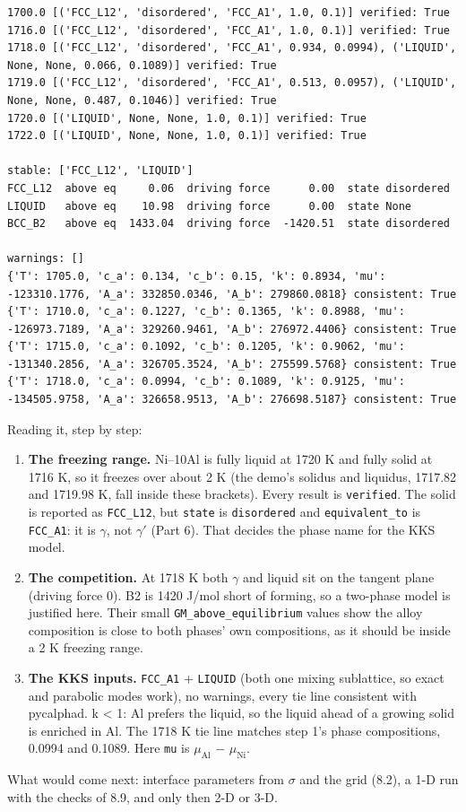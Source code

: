 \documentclass[12pt,a4paper]{article}
\begin{document}
\begin{lstlisting}[basicstyle={\scriptsize\ttfamily}]
1700.0 [('FCC_L12', 'disordered', 'FCC_A1', 1.0, 0.1)] verified: True
1716.0 [('FCC_L12', 'disordered', 'FCC_A1', 1.0, 0.1)] verified: True
1718.0 [('FCC_L12', 'disordered', 'FCC_A1', 0.934, 0.0994), ('LIQUID', None, None, 0.066, 0.1089)] verified: True
1719.0 [('FCC_L12', 'disordered', 'FCC_A1', 0.513, 0.0957), ('LIQUID', None, None, 0.487, 0.1046)] verified: True
1720.0 [('LIQUID', None, None, 1.0, 0.1)] verified: True
1722.0 [('LIQUID', None, None, 1.0, 0.1)] verified: True

stable: ['FCC_L12', 'LIQUID']
FCC_L12  above eq     0.06  driving force      0.00  state disordered
LIQUID   above eq    10.98  driving force      0.00  state None
BCC_B2   above eq  1433.04  driving force  -1420.51  state disordered

warnings: []
{'T': 1705.0, 'c_a': 0.134, 'c_b': 0.15, 'k': 0.8934, 'mu': -123310.1776, 'A_a': 332850.0346, 'A_b': 279860.0818} consistent: True
{'T': 1710.0, 'c_a': 0.1227, 'c_b': 0.1365, 'k': 0.8988, 'mu': -126973.7189, 'A_a': 329260.9461, 'A_b': 276972.4406} consistent: True
{'T': 1715.0, 'c_a': 0.1092, 'c_b': 0.1205, 'k': 0.9062, 'mu': -131340.2856, 'A_a': 326705.3524, 'A_b': 275599.5768} consistent: True
{'T': 1718.0, 'c_a': 0.0994, 'c_b': 0.1089, 'k': 0.9125, 'mu': -134505.9758, 'A_a': 326658.9513, 'A_b': 276698.5187} consistent: True
\end{lstlisting}
Reading it, step by step:

\begin{enumerate}
\item \textbf{The freezing range.} Ni--10Al is fully liquid at 1720 K and fully solid at 1716 K, so it freezes over about 2 K (the demo's solidus and liquidus, 1717.82 and 1719.98 K, fall inside these brackets). Every result is \texttt{verified}. The solid is reported as \texttt{FCC\_\allowbreak{}L12}, but \texttt{state} is \texttt{disordered} and \texttt{equivalent\_\allowbreak{}to} is \texttt{FCC\_\allowbreak{}A1}: it is \(\gamma\), not \(\gamma '\) (Part 6). That decides the phase name for the KKS model.
\item \textbf{The competition.} At 1718 K both \(\gamma\) and liquid sit on the tangent plane (driving force 0). B2 is 1420 J/mol short of forming, so a two-phase model is justified here. Their small \texttt{GM\_\allowbreak{}above\_\allowbreak{}equilibrium} values show the alloy composition is close to both phases' own compositions, as it should be inside a 2 K freezing range.
\item \textbf{The KKS inputs.} \texttt{FCC\_\allowbreak{}A1} + \texttt{LIQUID} (both one mixing sublattice, so exact and parabolic modes work), no warnings, every tie line consistent with pycalphad. k < 1: Al prefers the liquid, so the liquid ahead of a growing solid is enriched in Al. The 1718 K tie line matches step 1's phase compositions, 0.0994 and 0.1089. Here \texttt{mu} is \(\mu_{\mathrm{Al}}\) \(-\) \(\mu_{\mathrm{Ni}}\).
\end{enumerate}
What would come next: interface parameters from \(\sigma\) and the grid (8.2), a 1-D run with the checks of 8.9, and only then 2-D or 3-D.
\end{document}
